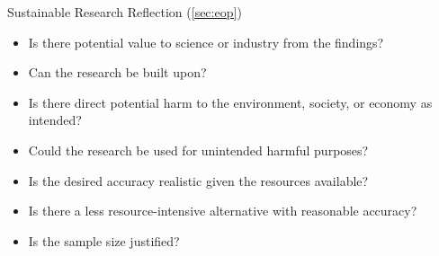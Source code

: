 \documentclass[../main.tex]{subfiles}
\begin{document}
\begin{checklistbox}{Sustainable Research Reflection \quad (\autoref{sec:eop})}
\begin{itemize}[leftmargin=2em]
  \item[\(\square\)] Is there potential value to science or industry from the findings?
  \item[\(\square\)] Can the research be built upon?
  \item[\(\square\)] Is there direct potential harm to the environment, society, or economy as intended?
  \item[\(\square\)] Could the research be used for unintended harmful purposes?
  \item[\(\square\)] Is the desired accuracy realistic given the resources available?
  \item[\(\square\)] Is there a less resource-intensive alternative with reasonable accuracy?
  \item[\(\square\)] Is the sample size justified?
\end{itemize}
\end{checklistbox}
\end{document}
